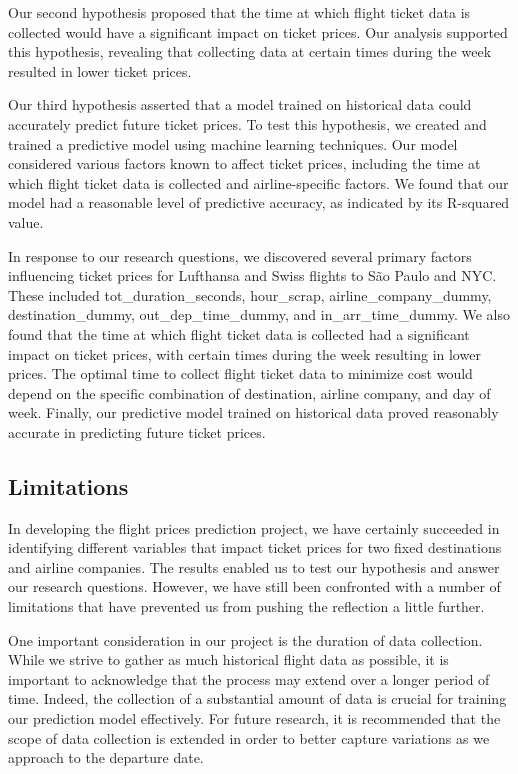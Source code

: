 Our second hypothesis proposed that the time at which flight ticket data is collected would have a significant impact on ticket prices.
Our analysis supported this hypothesis, revealing that collecting data at certain times during the week resulted in lower ticket prices.

Our third hypothesis asserted that a model trained on historical data could accurately predict future ticket prices.
To test this hypothesis, we created and trained a predictive model using machine learning techniques.
Our model considered various factors known to affect ticket prices, including the time at which flight ticket data is collected and airline-specific factors.
We found that our model had a reasonable level of predictive accuracy, as indicated by its R-squared value.

In response to our research questions, we discovered several primary factors influencing ticket prices for Lufthansa and Swiss flights to São Paulo and NYC.
These included tot\_duration\_seconds, hour\_scrap, airline\_company\_dummy, destination\_dummy, out\_dep\_time\_dummy, and in\_arr\_time\_dummy.
We also found that the time at which flight ticket data is collected had a significant impact on ticket prices, with certain times during the week resulting in lower prices.
The optimal time to collect flight ticket data to minimize cost would depend on the specific combination of destination, airline company, and day of week.
Finally, our predictive model trained on historical data proved reasonably accurate in predicting future ticket prices.

\subsection{Limitations}
\label{sec:limitation}
In developing the flight prices prediction project, we have certainly succeeded in identifying different variables that impact ticket prices for two fixed destinations and airline companies.
The results enabled us to test our hypothesis and answer our research questions. 
However, we have still been confronted with a number of limitations that have prevented us from pushing the reflection a little further.

One important consideration in our project is the duration of data collection. While we strive to gather as much historical flight data as possible, it is important to acknowledge that the process may extend over a longer period of time.
Indeed, the collection of a substantial amount of data is crucial for training our prediction model effectively.
For future research, it is recommended that the scope of data collection is extended in order to better capture variations as we approach to the departure date.

